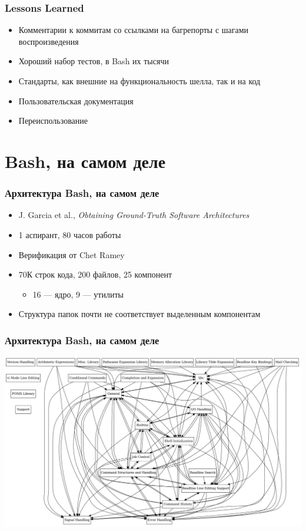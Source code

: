 \documentclass[xetex,mathserif,serif]{beamer}
\begin{document}
	\begin{frame}[fragile]
		\frametitle{Lessons Learned}
		\begin{itemize}
			\item Комментарии к коммитам со ссылками на багрепорты с шагами воспроизведения
			\item Хороший набор тестов, в Bash их тысячи
			\item Стандарты, как внешние на функциональность шелла, так и на код
			\item Пользовательская документация
			\item Переиспользование
		\end{itemize}
	\end{frame}

	\section{Bash, на самом деле}

	\begin{frame}
		\frametitle{Архитектура Bash, на самом деле}
		\begin{itemize}
			\item J. Garcia et al., \textit{Obtaining Ground-Truth Software Architectures}
			\item 1 аспирант, 80 часов работы
			\item Верификация от Chet Ramey
			\item 70К строк кода, 200 файлов, 25 компонент
			\begin{itemize}
				\item 16 --- ядро, 9 --- утилиты
			\end{itemize}
			\item Структура папок почти не соответствует выделенным компонентам
		\end{itemize}
	\end{frame}

	\begin{frame}
		\frametitle{Архитектура Bash, на самом деле}
		\begin{center}
			\includegraphics[width=\textwidth]{bashRealArchitecture.png}
		\end{center}
	\end{frame}
\end{document}

